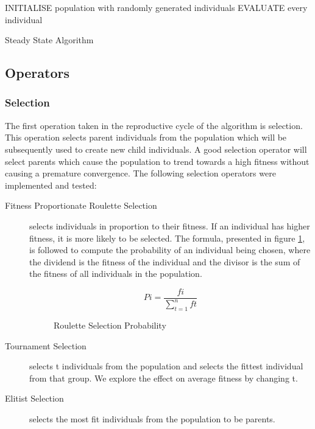 \documentclass[sigconf]{acmart}
\begin{document}
\begin{algorithm}
INITIALISE population with randomly generated individuals\;
EVALUATE every individual\;
\caption{Steady State Algorithm}
\end{algorithm}

\subsection{Operators}
\subsubsection{Selection}
The first operation taken in the reproductive cycle of the algorithm is selection. This operation selects parent individuals from the population which will be subsequently used to create new child individuals. A good selection operator will select parents which cause the population to trend towards a high fitness without causing a premature convergence. The following selection operators were implemented and tested:
\begin{description}
\item[Fitness Proportionate Roulette Selection] selects individuals in proportion to their fitness. If an individual has higher fitness, it is more likely to be selected. The formula, presented in figure \ref{fig:Roulette},  is followed to compute the probability of an individual being chosen, where the dividend is the fitness of the individual and the divisor is the sum of the fitness of all individuals in the population.  \cite{10.1162/evco.1996.4.4.361}
\begin{figure}[!htb]
\begin{equation}
    Pi = \frac{fi}{\sum_{t=1}^{n}ft}
\end{equation}
\caption{Roulette Selection Probability}
\label{fig:Roulette}
\end{figure}
\item[Tournament Selection] selects t individuals from the population and selects the fittest individual from that group. We explore the effect on average fitness by changing t. \cite{10.1162/evco.1996.4.4.361}
\item[Elitist Selection] selects the most fit individuals from the population to be parents.
\end{description}
\end{document}
